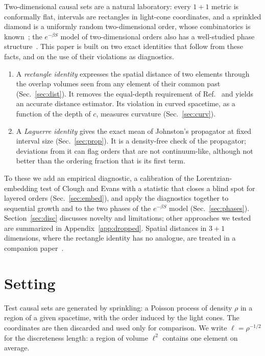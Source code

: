 \documentclass[prd,twocolumn,superscriptaddress,nofootinbib,amsmath,amssymb,floatfix]{revtex4-2}
\begin{document}
Two-dimensional causal sets are a natural laboratory: every $1+1$ metric is conformally flat, intervals are rectangles in light-cone coordinates, and a sprinkled diamond is a uniformly random two-dimensional order, whose combinatorics is known~\cite{BHS08,Surya12}; the $e^{-\beta S}$ model of two-dimensional orders also has a well-studied phase structure~\cite{BHS08,Surya12,GOS18}. This paper is built on two exact identities that follow from these facts, and on the use of their violations as diagnostics.
\begin{enumerate}
\item A \emph{rectangle identity} expresses the spatial distance of two elements through the overlap volumes seen from any element of their common past (Sec.~\ref{sec:dist}). It removes the equal-depth requirement of Ref.~\cite{BK24} and yields an accurate distance estimator. Its violation in curved spacetime, as a function of the depth of $c$, measures curvature (Sec.~\ref{sec:curv}).
\item A \emph{Laguerre identity} gives the exact mean of Johnston's propagator at fixed interval size (Sec.~\ref{sec:prop}). It is a density-free check of the propagator; deviations from it can flag orders that are not continuum-like, although not better than the ordering fraction that is its first term.
\end{enumerate}
To these we add an empirical diagnostic, a calibration of the Lorentzian-embedding test of Clough and Evans with a statistic that closes a blind spot for layered orders (Sec.~\ref{sec:embed}), and apply the diagnostics together to sequential growth and to the two phases of the $e^{-\beta S}$ model (Sec.~\ref{sec:phases}). Section~\ref{sec:disc} discusses novelty and limitations; other approaches we tested are summarized in Appendix~\ref{app:dropped}. Spatial distances in $3+1$ dimensions, where the rectangle identity has no analogue, are treated in a companion paper~\cite{Embedding}.

\section{Setting}\label{sec:setting}
Test causal sets are generated by sprinkling: a Poisson process of density $\rho$ in a region of a given spacetime, with the order induced by the light cones. The coordinates are then discarded and used only for comparison. We write $\ell=\rho^{-1/2}$ for the discreteness length: a region of volume $\ell^2$ contains one element on average.
\end{document}
